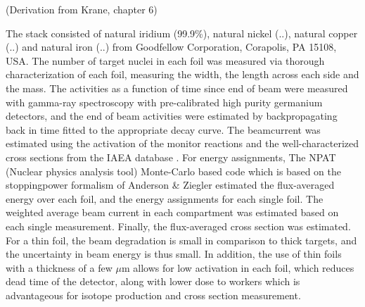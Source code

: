 (Derivation from Krane, chapter 6)


\noindent
 The stack consisted of natural iridium (99.9\%), natural nickel (..), natural copper (..) and natural iron (..) from Goodfellow Corporation, Corapolis, PA 15108, USA. The number of target nuclei in each foil was measured via thorough characterization of each foil, measuring the width, the length across each side and the mass. The activities as a function of time since end of beam were measured with gamma-ray spectroscopy with pre-calibrated high purity germanium detectors, and the end of beam activities were estimated by backpropagating back in time fitted to the appropriate decay curve. The beamcurrent was estimated using the activation of the monitor reactions and the well-characterized cross sections from the IAEA database \cite{Hermanne2013}. For energy assignments, The NPAT (Nuclear physics analysis tool) Monte-Carlo based code which is based on the stoppingpower formalism of Anderson \& Ziegler \cite{MorellJ., Ziegler1999} estimated the flux-averaged energy over each foil, and the energy assignments for each single foil. The weighted average beam current in each compartment was estimated based on each single measurement. Finally, the flux-averaged cross section was estimated. \\

For a thin foil, the beam degradation is small in comparison to thick targets, and the uncertainty in beam energy is thus small. In addition, the use of thin foils with a thickness of a few $\mu$m allows for low activation in each foil, which reduces dead time of the detector, along with lower dose to workers which is advantageous for isotope production and cross section measurement\cite{Qaim2017c}. \\

